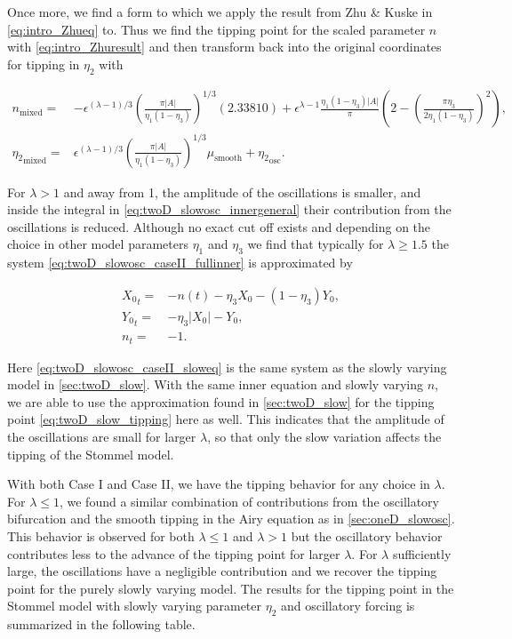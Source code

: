 Once more, we find a form to which we apply the result from Zhu \& Kuske in \eqref{eq:intro_Zhueq} to. Thus we find the tipping point for the scaled parameter $n$ with \eqref{eq:intro_Zhuresult} and then transform back into the original coordinates for tipping in $\eta_2$ with

\begin{equation}
\begin{aligned}
n_{\text{mixed}}=&-\epsilon^{(\lambda-1)/3}\left(\frac{\pi|A|}{\eta_1(1-\eta_3)}\right)^{1/3}(2.33810)+\epsilon^{\lambda-1}\frac{\eta_1(1-\eta_3)|A|}{\pi}\left(2-\left(\frac{\pi\eta_3}{2\eta_1(1-\eta_3)}\right)^2\right),\\
{\eta_2}_{\text{mixed}}=& \epsilon^{(\lambda-1)/3}\left(\frac{\pi|A|}{\eta_1(1-\eta_3)}\right)^{1/3}\mu_{\text{smooth}}+{\eta_2}_{\text{osc}}.
\end{aligned}
\end{equation}

For $\lambda>1$ and away from 1, the amplitude of the oscillations is smaller, and inside the integral in \eqref{eq:twoD_slowosc_innergeneral} their contribution from the oscillations is reduced. Although no exact cut off exists and depending on the choice in other model parameters $\eta_1$ and $\eta_3$ we find that typically for $\lambda\ge 1.5$ the system \eqref{eq:twoD_slowosc_caseII_fullinner} is approximated by

\begin{equation}\label{eq:twoD_slowosc_caseII_sloweq}
\begin{aligned}
{X_0}_t =& -n(t)-\eta_3 X_0 -(1-\eta_3)Y_0,\\
{Y_0}_t =&-\eta_3|X_0|-Y_0,\\
n_t  =&-1.
\end{aligned}
\end{equation}

Here \eqref{eq:twoD_slowosc_caseII_sloweq} is the same system as the slowly varying model in \autoref{sec:twoD_slow}. With the same inner equation and slowly varying $n$, we are able to use the approximation found in \autoref{sec:twoD_slow} for the tipping point \eqref{eq:twoD_slow_tipping} here as well. This indicates that the amplitude of the oscillations are small for larger $\lambda$, so that only the slow variation affects the tipping of the Stommel model.

With both Case I and Case II, we have the tipping behavior for any choice in $\lambda$. For $\lambda\le1$, we found a similar combination of contributions from the oscillatory bifurcation and the smooth tipping in the Airy equation as in \autoref{sec:oneD_slowosc}. This behavior is observed for both $\lambda\le 1$ and $\lambda>1$ but the oscillatory behavior contributes less to the advance of the tipping point for larger $\lambda$. For $\lambda$ sufficiently large, the oscillations have a negligible contribution and we recover the tipping point for the purely slowly varying model. The results for the tipping point in the Stommel model with slowly varying parameter $\eta_2$ and oscillatory forcing is summarized in the following table.

